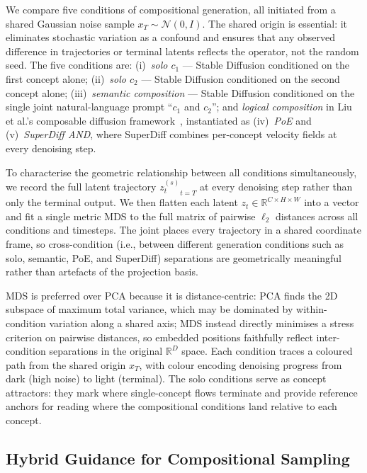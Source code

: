 We compare five conditions of compositional generation, all initiated from a shared Gaussian noise sample $x_T \sim \mathcal{N}(0,I)$. The shared origin is essential: it eliminates stochastic variation as a confound and ensures that any observed difference in trajectories or terminal latents reflects the operator, not the random seed. The five conditions are: (i)~\emph{solo $c_1$} — Stable Diffusion conditioned on the first concept alone; (ii)~\emph{solo $c_2$} — Stable Diffusion conditioned on the second concept alone; (iii)~\emph{semantic composition} — Stable Diffusion conditioned on the single joint natural-language prompt ``$c_1$ and $c_2$''; and \emph{logical composition} in Liu et al.'s composable diffusion framework~\cite{liu2022compositional}, instantiated as (iv)~\emph{PoE} and (v)~\emph{SuperDiff AND}, where SuperDiff combines per-concept velocity fields at every denoising step.

To characterise the geometric relationship between all conditions simultaneously, we record the full latent trajectory ${z_t^{(s)}}_{t=T}$ at every denoising step rather than only the terminal output. We then flatten each latent $z_t \in \mathbb{R}^{C\times H\times W}$ into a vector and fit a single metric MDS to the full matrix of pairwise $\ell_2$ distances across all conditions and timesteps. The joint places every trajectory in a shared coordinate frame, so cross-condition (i.e., between different generation conditions such as solo, semantic, PoE, and SuperDiff) separations are geometrically meaningful rather than artefacts of the projection basis. 

MDS is preferred over PCA because it is distance-centric: PCA finds the 2D subspace of maximum total variance, which may be dominated by within-condition variation along a shared axis; MDS instead directly minimises a stress criterion on pairwise distances, so embedded positions faithfully reflect inter-condition separations in the original $\mathbb{R}^D$ space. Each condition traces a coloured path from the shared origin $x_T$, with colour encoding denoising progress from dark (high noise) to light (terminal). The solo conditions serve as concept attractors: they mark where single-concept flows terminate and provide reference anchors for reading where the compositional conditions land relative to each concept.

\subsection{Hybrid Guidance for Compositional Sampling}
\label{sec:hybrid}

